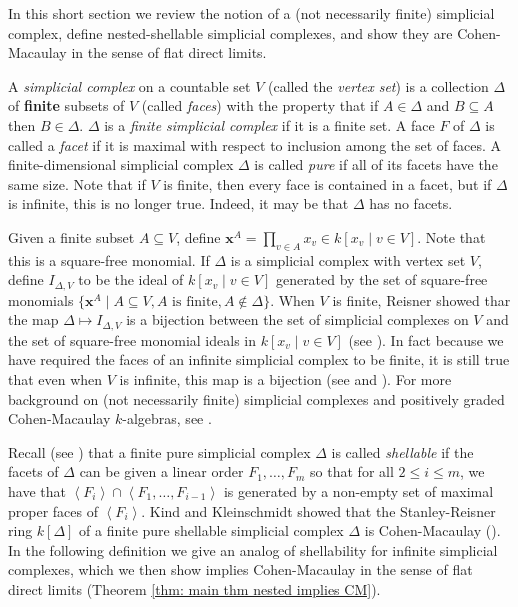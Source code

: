 \documentclass[oneside,11pt,reqno]{amsart}
\theoremstyle{definition}
\newtheorem{proof techniques}{Proof Techniques}
\begin{document}
In this short section we review the notion of a (not necessarily finite) simplicial complex, define nested-shellable simplicial complexes, and show they are Cohen-Macaulay in the sense of flat direct limits. 

A \emph{simplicial complex} on a countable set $V$ (called the \emph{vertex set}) is a collection $\Delta$ of \textbf{finite} subsets of $V$ (called \emph{faces}) with the property that if $A \in \Delta$ and $B \subseteq A$ then $B \in \Delta$. $\Delta$ is a \emph{finite simplicial complex} if it is a finite set. A face $F$ of $\Delta$ is called a \emph{facet} if it is maximal with respect to inclusion among the set of faces. A finite-dimensional simplicial complex $\Delta$ is called \emph{pure} if all of its facets have the same size. Note that if $V$ is finite, then every face is contained in a facet, but if $\Delta$ is infinite, this is no longer true. Indeed, it may be that $\Delta$ has no facets. 

Given a finite subset $A \subseteq V$, define $\textbf{x}^A = \prod_{v \in A} x_v \in k[x_v \mid v \in V]$. Note that this is a square-free monomial. If $\Delta$ is a simplicial complex with vertex set $V$, define $I_{\Delta, V}$ to be the ideal of $k[x_v \mid v \in V]$ generated by the set of square-free monomials $\{ \textbf{x}^A \mid A \subseteq V, A \text{ is finite}, A \notin \Delta \}$. When $V$ is finite, Reisner showed thar the map $\Delta \mapsto I_{\Delta, V}$ is a bijection between the set of simplicial complexes on $V$ and the set of square-free monomial ideals in $k[x_v \mid v \in V ]$ (see \cite{reisner1976cohen}). In fact because we have required the faces of an infinite simplicial complex to be finite, it is still true that even when $V$ is infinite, this map is a bijection (see \cite[Proposition 2]{chlopecki2026antidiagonal} and \cite[Remark 1]{chlopecki2026antidiagonal}). For more background on (not necessarily finite) simplicial complexes and positively graded Cohen-Macaulay $k$-algebras, see \cite{chlopecki2026antidiagonal}. 

Recall (see \cite[5.1.11]{bruns1998cohen}) that a finite pure simplicial complex $\Delta$ is called \emph{shellable} if the facets of $\Delta$ can be given a linear order $F_1, \ldots, F_m$ so that for all $2 \leq i \leq m$, we have that $\left\langle F_i\right\rangle \cap\left\langle F_1, \ldots, F_{i-1}\right\rangle$ is generated by a non-empty set of maximal proper faces of $\left\langle F_i\right\rangle$. Kind and Kleinschmidt showed that the Stanley-Reisner ring $k[\Delta]$ of a finite pure shellable simplicial complex $\Delta$ is Cohen-Macaulay (\cite{kind_schalbare_1979}). In the following definition we give an analog of shellability for infinite simplicial complexes, which we then show implies Cohen-Macaulay in the sense of flat direct limits (Theorem \ref{thm: main thm nested implies CM}).
\end{document}
